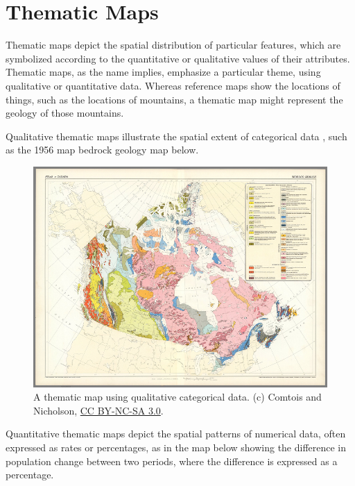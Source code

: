 \documentclass[
]{book}
\begin{document}
\hypertarget{thematic-maps}{%
\section{Thematic Maps}\label{thematic-maps}}

Thematic maps depict the spatial distribution of particular features, which are symbolized according to the quantitative or qualitative values of their attributes. Thematic maps, as the name implies, emphasize a particular theme, using qualitative or quantitative data. Whereas reference maps show the locations of things, such as the locations of mountains, a thematic map might represent the geology of those mountains.

Qualitative thematic maps illustrate the spatial extent of categorical data \citep{anderson_types_2020}, such as the 1956 map bedrock geology map below.

\begin{figure}
\centering
\includegraphics{images/17-geology.png}
\caption{A thematic map using qualitative categorical data. \citep{nicholson_bedrock_1956} (c) Comtois and Nicholson, \href{https://creativecommons.org/licenses/by-nc-sa/3.0/}{CC BY-NC-SA 3.0}.}
\end{figure}

Quantitative thematic maps depict the spatial patterns of numerical data, often expressed as rates or percentages, as in the map below showing the difference in population change between two periods, where the difference is expressed as a percentage.
\end{document}
